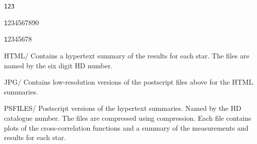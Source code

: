 \begin{Ventry}{\texttt{123}}
\begin{Ventry}{{\texttt 1234567890}}
\begin{Ventry}{{\texttt 12345678}}
		\item[HTML/]
			Contains a hypertext summary of the results
			for each star. The files are named by the six
			digit HD number.

		\item[JPG/]
			Contains low-resolution versions of the
			postscript files above for the HTML summaries.

                \item[PSFILES/]
			Postscript versions of the hypertext summaries. Named
			by the HD catalogue number. The files are compressed
			using  compression. Each file contains plots
                        of the cross-correlation functions and a summary of
			the measurements and results for each star.
		\end{Ventry}
	\end{Ventry}
\end{Ventry}



